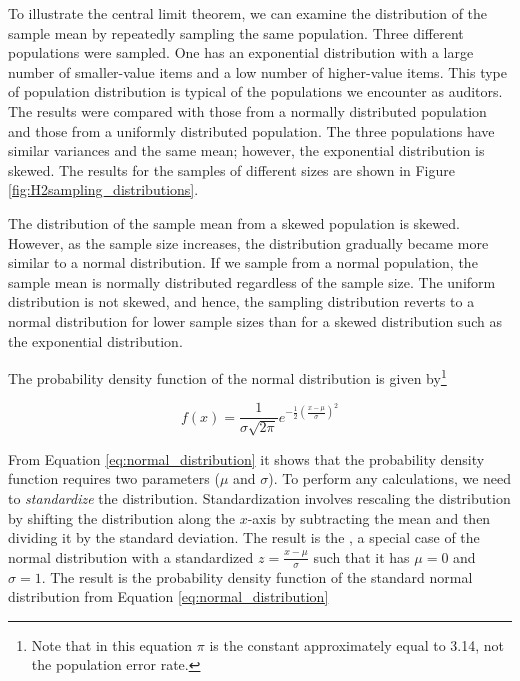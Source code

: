 To illustrate the central limit theorem, we can examine the distribution of the sample mean by repeatedly sampling the same population. Three different populations were sampled. One has an exponential distribution with a large number of smaller-value items and a low number of higher-value items. This type of population distribution is typical of the populations we encounter as auditors. The results were compared with those from a normally distributed population and those from a uniformly distributed population. The three populations have similar variances and the same mean; however, the exponential distribution is skewed. The results for the samples of different sizes are shown in Figure \ref{fig:H2sampling_distributions}.

\bigskip
The distribution of the sample mean from a skewed population is skewed. However, as the sample size increases, the distribution gradually became more similar to a normal distribution. If we sample from a normal population, the sample mean is normally distributed regardless of the sample size. The uniform distribution is not skewed, and hence, the sampling distribution reverts to a normal distribution for lower sample sizes than for a skewed distribution such as the exponential distribution.

\bigskip
The probability density function of the normal distribution is given by\footnote{Note that in this equation $\pi$ is the constant approximately equal to 3.14, not the population error rate.}

\begin{equation}
  f(x) = \frac{1}{\sigma\sqrt{2\pi}}e^{-\frac{1}{2}\left( \frac{x-\mu}{\sigma} \right)^2}
  \label{eq:normal_distribution}
\end{equation}

From Equation \ref{eq:normal_distribution} it shows that the probability density function requires two parameters ($\mu$ and $\sigma$). To perform any calculations, we need to \emph{standardize} the distribution. Standardization involves rescaling the distribution by shifting the distribution along the $x$-axis by subtracting the mean and then dividing it by the standard deviation. The result is the , a special case of the normal distribution with a standardized $z = \frac{x - \mu}{\sigma}$ such that it has $\mu = 0$ and $\sigma = 1$. The result is the probability density function of the standard normal distribution from Equation \ref{eq:normal_distribution}

